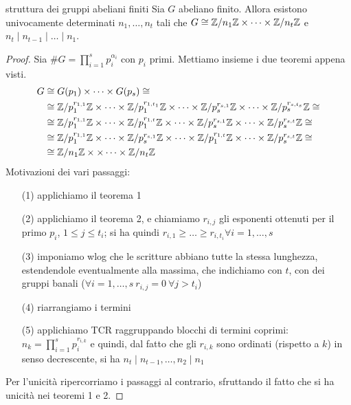 \begin{theorem}{struttura dei gruppi abeliani finiti}
    Sia $G$ abeliano finito. Allora esistono univocamente determinati $n_1, \dots, n_t$ tali che $G \cong \mathbb{Z}/n_1\mathbb{Z} \times \dots \times \mathbb{Z}/n_t\mathbb{Z}$ e $n_t \mid n_{t-1} \mid \dots \mid n_1$.
\end{theorem}
\begin{proof}
    Sia $\#G = \prod_{i = 1}^s p_i^{\alpha_i}$ con $p_i$ primi. Mettiamo insieme i due teoremi appena visti.
    \begin{align}
        G & \cong G(p_1) \times \dots \times G(p_s) \cong \\
        & \cong \mathbb{Z}/p_1^{r_{1,1}}\mathbb{Z} \times \dots \times \mathbb{Z}/p_1^{r_{1,t_1}}\mathbb{Z} \times \dots \times \mathbb{Z}/p_s^{r_{s,1}}\mathbb{Z} \times \dots \times \mathbb{Z}/p_s^{r_{s,t_s}}\mathbb{Z} \cong \\
        & \cong \mathbb{Z}/p_1^{r_{1,1}}\mathbb{Z} \times \dots \times \mathbb{Z}/p_1^{r_{1,t}}\mathbb{Z} \times \dots \times \mathbb{Z}/p_s^{r_{s,1}}\mathbb{Z} \times \dots \times \mathbb{Z}/p_s^{r_{s,t}}\mathbb{Z} \cong  \\
        & \cong \mathbb{Z}/p_1^{r_{1,1}}\mathbb{Z} \times \dots \times \mathbb{Z}/p_s^{r_{s,1}}\mathbb{Z} \times \dots \times \mathbb{Z}/p_1^{r_{1,t}}\mathbb{Z} \times \dots \times \mathbb{Z}/p_s^{r_{s,t}}\mathbb{Z} \cong  \\
        & \cong \mathbb{Z}/n_1\mathbb{Z} \times \times \dots \times \mathbb{Z}/n_t\mathbb{Z} 
        \end{align}
    Motivazioni dei vari passaggi:
    \begin{itemize}
        \item[(1)] applichiamo il teorema 1
        \item[(2)] applichiamo il teorema 2, e chiamiamo $r_{i,j}$ gli esponenti ottenuti per il primo $p_i$, $1 \leq j \leq t_i$; si ha quindi $r_{i,1} \geq \dots \geq r_{i,t_i} \forall i = 1,\dots, s$
        \item[(3)] imponiamo wlog che le scritture abbiano tutte la stessa lunghezza, estendendole eventualmente alla massima, che indichiamo con $t$, con dei gruppi banali ($\forall i = 1,\dots,s \ r_{i,j} = 0 \ \forall j > t_i$)
        \item[(4)] riarrangiamo i termini
        \item[(5)] applichiamo TCR raggruppando blocchi di termini coprimi: $n_k = \prod_{i = 1}^s p_i^{r_{i,k}}$ e quindi, dal fatto che gli $r_{i,k}$ sono ordinati (rispetto a $k$) in senso decrescente, si ha $n_t \mid n_{t-1},  \dots, n_2 \mid n_1$
    \end{itemize}
    Per l'unicità ripercorriamo i passaggi al contrario, sfruttando il fatto che si ha unicità nei teoremi 1 e 2.
\end{proof} 

